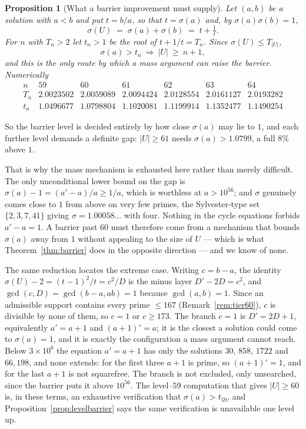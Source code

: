 \documentclass[11pt]{article}
\newtheorem{proposition}[theorem]{Proposition}
\theoremstyle{definition}
\begin{document}
\begin{proposition}[What a barrier improvement must supply]\label{prop:barthreshold}
Let $(a,b)$ be a solution with $a<b$ and put $t=b/a$, so that $t=\sigma(a)$ and, by
$\sigma(a)\sigma(b)=1$,
\[ \sigma(U)\;=\;\sigma(a)+\sigma(b)\;=\;t+\tfrac1t. \]
For $n$ with $T_n>2$ let $t_n>1$ be the root of $t+1/t=T_n$. Since $\sigma(U)\le T_{|U|}$,
\[ \sigma(a)>t_n\ \Longrightarrow\ |U|\ \ge\ n+1, \]
and this is the only route by which a mass argument can raise the barrier. Numerically
\[
\begin{array}{l|cccccc}
n & 59 & 60 & 61 & 62 & 63 & 64\\\hline
T_n & 2.0023502 & 2.0059089 & 2.0094424 & 2.0128554 & 2.0161127 & 2.0193282\\
t_n & 1.0496677 & 1.0798804 & 1.1020081 & 1.1199914 & 1.1352477 & 1.1490254
\end{array}
\]
\end{proposition}

So the barrier level is decided entirely by how close $\sigma(a)$ may lie to $1$, and each further
level demands a definite gap: $|U|\ge61$ needs $\sigma(a)>1.0799$, a full $8\%$ above $1$.

That is why the mass mechanism is exhausted here rather than merely difficult. The only
unconditional lower bound on the gap is $\sigma(a)-1=(a'-a)/a\ge1/a$, which is worthless at
$a>10^{56}$; and $\sigma$ genuinely comes close to $1$ from above on very few primes, the
Sylvester-type set $\{2,3,7,41\}$ giving $\sigma=1.00058\ldots$ with four. Nothing in the cycle
equations forbids $a'-a=1$. A barrier past $60$ must therefore come from a mechanism that bounds
$\sigma(a)$ away from $1$ without appealing to the size of $U$ --- which is what
Theorem~\ref{thm:barrier} does in the opposite direction --- and we know of none.

The same reduction locates the extreme case. Writing $c=b-a$, the identity
$\sigma(U)-2=(t-1)^2/t=c^2/D$ is the minus layer $D'-2D=c^2$, and $\gcd(c,D)=\gcd(b-a,ab)=1$ because
$\gcd(a,b)=1$. Since an admissible support contains every prime $\le167$
\textup{(}Remark~\ref{rem:tier60}\textup{)}, $c$ is divisible by none of them, so $c=1$ or
$c\ge173$. The branch $c=1$ is $D'=2D+1$, equivalently $a'=a+1$ and $(a+1)'=a$; it is the closest a
solution could come to $\sigma(a)=1$, and it is exactly the configuration a mass argument cannot
reach. Below $3\times10^{6}$ the equation $a'=a+1$ has only the solutions $30$, $858$, $1722$ and
$66{,}198$, and none extends: for the first three $a+1$ is prime, so $(a+1)'=1$, and for the last
$a+1$ is not squarefree. The branch is not excluded, only unsearched, since the barrier puts it above
$10^{56}$. The level--$59$
computation that gives $|U|\ge60$ is, in these terms, an exhaustive verification that
$\sigma(a)>t_{59}$, and Proposition~\ref{prop:levelbarrier} says the same verification is unavailable
one level up.
\end{document}
